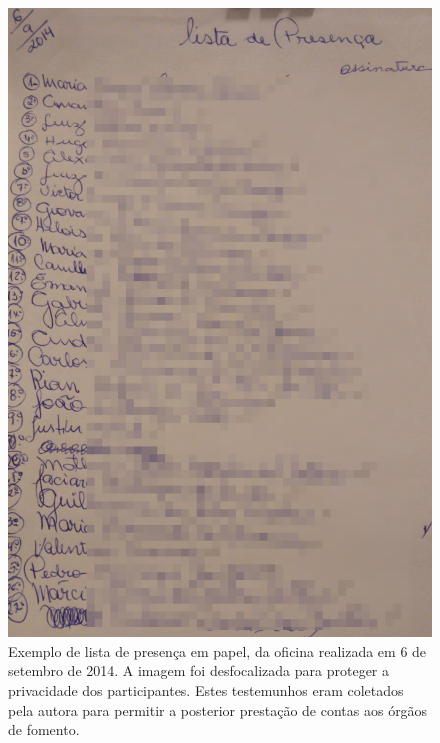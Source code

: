 \documentclass[
12pt,		%
openright,	%
twoside,  %
a4paper,			%
chapter=TITLE,		%
english,			%
french,				%
spanish,			%
brazil				%
]{USPSC-classe/USPSC}
\begin{document}
\begin{figure}[max size={\textwidth}{\textheight}]
\begin{minipage}[b]{0.4\linewidth}
                \label{dec219c809788f521312f8d75d2f5591f069f132}
\end{minipage}%
\hspace{0.5cm}
\begin{minipage}[b]{0.4\linewidth}
        \centering
                \includegraphics[width=1.0\linewidth]{../../imagens/blurred-Presenca-Oficina-2014-09-06.jpeg}
                \caption{Exemplo de lista de presen\c{c}a em papel, da oficina realizada em 6 de setembro de 2014. A imagem foi desfocalizada para proteger a privacidade dos participantes. Estes testemunhos eram coletados pela autora para permitir a posterior presta\c{c}\~ao de contas aos \'org\~aos de fomento.}
                \label{9a8c04c719fc4f9811165547ded35a00eb4fbeed}
\end{minipage}
\hspace{0.5cm}

\end{figure}
\end{document}
